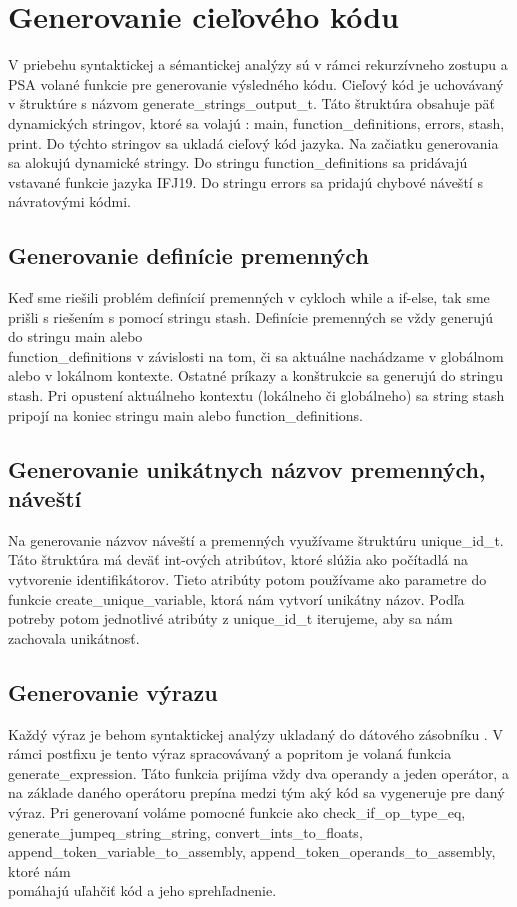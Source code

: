 \documentclass{article}
\begin{document}
	\section{Generovanie cieľového kódu}
	V priebehu syntaktickej a sémantickej analýzy sú v rámci rekurzívneho zostupu a PSA volané funkcie pre generovanie výsledného kódu. Cieľový kód je uchovávaný v štruktúre s názvom generate\_strings\_output\_t. Táto štruktúra obsahuje päť dynamických stringov, ktoré sa volajú : main, function\_definitions, errors, stash, print. Do týchto stringov sa ukladá cieľový kód jazyka. 
	Na začiatku generovania sa alokujú dynamické stringy.  Do stringu function\_definitions sa pridávajú vstavané funkcie jazyka IFJ19. Do stringu errors sa pridajú chybové náveští s návratovými kódmi. 
	\subsection{Generovanie definície premenných}
	Keď sme riešili problém definícií premenných v cykloch while a if-else, tak sme prišli s riešením s pomocí stringu stash. Definície premenných se vždy generujú do stringu main alebo \\function\_definitions v závislosti na tom, či sa aktuálne nachádzame v globálnom alebo v  lokálnom kontexte. Ostatné príkazy a konštrukcie sa generujú do stringu stash. Pri opustení aktuálneho kontextu (lokálneho či globálneho) sa string stash pripojí na koniec stringu main alebo function\_definitions.
	\subsection{Generovanie unikátnych názvov premenných, náveští}
	Na generovanie názvov náveští a premenných využívame štruktúru unique\_id\_t. Táto štruktúra má deväť int-ových atribútov, ktoré slúžia ako počítadlá na vytvorenie identifikátorov. Tieto atribúty potom používame ako parametre do funkcie create\_unique\_variable, ktorá nám vytvorí unikátny názov. Podľa potreby potom jednotlivé atribúty z unique\_id\_t iterujeme, aby sa nám zachovala unikátnosť.
	\subsection{Generovanie výrazu}
	Každý výraz je behom syntaktickej analýzy ukladaný do dátového zásobníku . V rámci postfixu je tento výraz spracovávaný a popritom je volaná funkcia generate\_expression. Táto funkcia prijíma vždy dva operandy a jeden operátor, a na základe daného operátoru prepína medzi tým aký kód sa vygeneruje pre daný výraz. Pri generovaní voláme pomocné funkcie ako  check\_if\_op\_type\_eq, generate\_jumpeq\_string\_string, convert\_ints\_to\_floats, \\append\_token\_variable\_to\_assembly, append\_token\_operands\_to\_assembly, ktoré nám \\pomáhajú uľahčiť kód a jeho sprehľadnenie.
	
\end{document}
